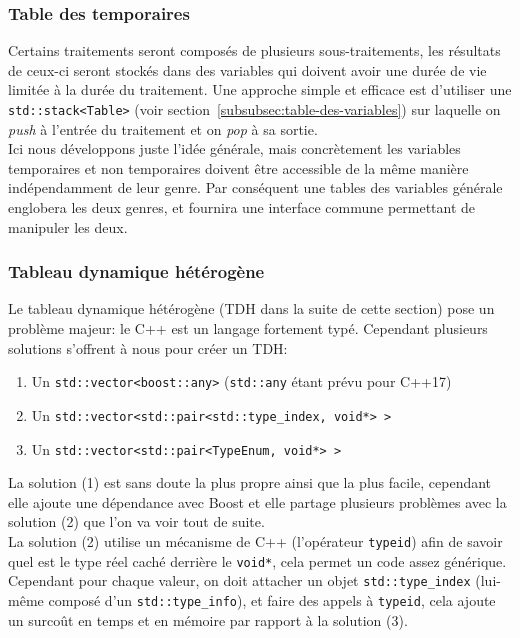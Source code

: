 \documentclass[french]{article}
\begin{document}
		\subsubsection{Table des temporaires}
		\label{subsubsec:table-des-temporaires}
		Certains traitements seront composés de plusieurs sous-traitements, les résultats de ceux-ci seront stockés dans des variables qui doivent avoir une durée de vie limitée à la durée du traitement. Une approche simple et efficace est d'utiliser une \texttt{std::stack<Table>} (voir section~\ref{subsubsec:table-des-variables}) sur laquelle on \textit{push} à l'entrée du traitement et on \textit{pop} à sa sortie.\\
		
		Ici nous développons juste l'idée générale, mais concrètement les variables temporaires et non temporaires doivent être accessible de la même manière indépendamment de leur genre. Par conséquent une tables des variables générale englobera les deux genres, et fournira une interface commune permettant de manipuler les deux.
		
		\subsubsection{Tableau dynamique hétérogène}
		\label{subsubsec:tableau-dynamique-heterogene}
		Le tableau dynamique hétérogène (TDH dans la suite de cette section) pose un problème majeur: le C++ est un langage fortement typé. Cependant plusieurs solutions s'offrent à nous pour créer un TDH:
		
		\begin{enumerate}
			\item Un \texttt{std::vector<boost::any>} (\texttt{std::any} étant prévu pour C++17)
			\item Un \texttt{std::vector<std::pair<std::type\_index, void*> >}
			\item Un \texttt{std::vector<std::pair<TypeEnum, void*> >}
		\end{enumerate}
		
		La solution (1) est sans doute la plus propre ainsi que la plus facile, cependant elle ajoute une dépendance avec Boost et elle partage plusieurs problèmes avec la solution (2) que l'on va voir tout de suite.\\
		
		La solution (2) utilise un mécanisme de C++ (l'opérateur \texttt{typeid}) afin de savoir quel est le type réel caché derrière le \texttt{void*}, cela permet un code assez générique. Cependant pour chaque valeur, on doit attacher un objet \texttt{std::type\_index} (lui-même composé d'un \texttt{std::type\_info}), et faire des appels à \texttt{typeid}, cela ajoute un surcoût en temps et en mémoire par rapport à la solution (3).\\
		
\end{document}
